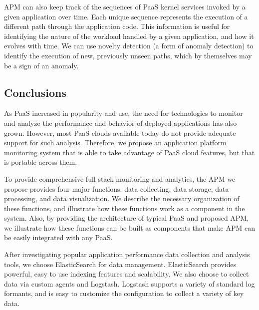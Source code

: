 APM can also keep track of the sequences of PaaS kernel services invoked by a given application over time.
Each unique sequence represents the execution of a different path through the application code. 
This information is useful for
identifying the nature of the workload handled by a given application, and how it evolves with time. 
We can use novelty detection (a form of anomaly detection) to identify the execution of new, previously
unseen paths, which by themselves may be a sign of an anomaly.

\subsection{Conclusions}
As PaaS increased in popularity and use, the need 
for technologies to monitor and analyze the performance and behavior of
deployed applications has also grown. 
However, most PaaS clouds available today do not provide adequate support
for such analysis.
Therefore, we propose an application platform monitoring system that 
is able to take advantage of PaaS cloud features, but that is portable
across them.

To provide comprehensive full stack monitoring and analytics, 
the APM we propose provides four major functions:
data collecting, data storage, data processing, and data visualization. 
We describe the necessary organization of
these functions, and illustrate how these functions work as 
a component in the system. Also, by providing the
architecture of typical PaaS and proposed APM, we illustrate how these functions can be built as components that
make APM can be easily integrated with any PaaS.

After investigating popular application performance data collection and analysis tools, we choose ElasticSearch for data management.
ElasticSearch provides powerful, easy to use indexing features and scalability. We also choose to collect data via custom agents and Logstash.
Logstash supports a variety of standard log formants,
and is easy to customize the configuration to collect a variety of key data.
